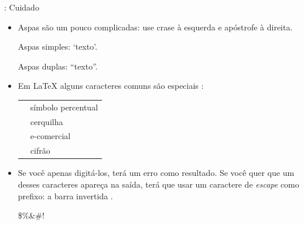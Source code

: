 \documentclass{beamer}
\begin{document}
\begin{frame}[fragile]{\insertsubsection{}: Cuidado}
\small
	\begin{itemize}
	\item Aspas são um pouco complicadas: use crase \keystroke{\`{}} à esquerda e apóstrofe \keystroke{\'{}} à direita.
		\begin{exampletwouptiny}
			Aspas simples: `texto'.
	
			Aspas duplas: ``texto''.
		\end{exampletwouptiny}
	
	\item Em \LaTeX{} alguns caracteres comuns são especiais :\\[1ex]
		\begin{tabular}{cl}
			\keystrokebftt{\%} & símbolo percentual              \\
			\keystrokebftt{\#} & cerquilha  \\
			\keystrokebftt{\&} & e-comercial                 \\
			\keystrokebftt{\$} & cifrão               \\
		\end{tabular}
	\item Se você apenas digitá-los, terá um erro como resultado. Se você quer que um desses caracteres apareça na saída, terá que usar um caractere de \emph{escape} como prefixo: a barra invertida \keystrokebftt{$\backslash$}.
		\begin{exampletwoup}
			\$\%\&\#!
		\end{exampletwoup}
	\end{itemize}
\end{frame}
\end{document}
